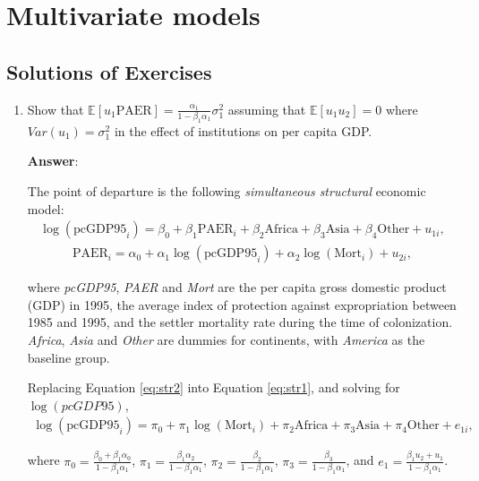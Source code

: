 \chapter{Multivariate models}\label{chap7}

\section{Solutions of Exercises}\label{sec71}
\begin{enumerate}[leftmargin=*]

	\item Show that $\mathbb{E}[u_1\text{PAER}]=\frac{\alpha_1}{1-\beta_1\alpha_1}\sigma^2_1$ assuming that $\mathbb{E}[u_1u_2]=0$ where $Var(u_1)=\sigma^2_1$ in the effect of institutions on per capita GDP.
	
	\textbf{Answer}:
	
	The point of departure is the following \textit{simultaneous structural} economic model:
	\begin{align}\label{eq:str1}
		\log(\text{pcGDP95}_i)=\beta_0+\beta_1\text{PAER}_i+\beta_2 \text{Africa}+\beta_3 \text{Asia}+\beta_4 \text{Other}+u_{1i},
	\end{align}
	\begin{align}\label{eq:str2}
		\text{PAER}_i=\alpha_0+\alpha_1\log(\text{pcGDP95}_i)+\alpha_2\log(\text{Mort}_i)+u_{2i},
	\end{align}

where \textit{pcGDP95}, \textit{PAER} and \textit{Mort} are the per capita gross domestic product (GDP) in 1995, the average index of protection against expropriation between 1985 and 1995, and the settler mortality rate during the time of colonization. \textit{Africa}, \textit{Asia} and \textit{Other} are dummies for continents, with \textit{America} as the baseline group.

Replacing Equation \ref{eq:str2} into Equation \ref{eq:str1}, and solving for $\log(\textit{pcGDP95})$,
\begin{align}\label{eq:red1}
	\log(\text{pcGDP95}_i)=\pi_0+\pi_1\log(\text{Mort}_i)+\pi_2 \text{Africa}+\pi_3 \text{Asia}+\pi_4 \text{Other}+e_{1i},   
\end{align}

where $\pi_0=\frac{\beta_0+\beta_1\alpha_0}{1-\beta_1\alpha_1}$, $\pi_1=\frac{\beta_1\alpha_2}{1-\beta_1\alpha_1}$, $\pi_2=\frac{\beta_2}{1-\beta_1\alpha_1}$, $\pi_3=\frac{\beta_3}{1-\beta_1\alpha_1}$, and $e_1=\frac{\beta_1u_2+u_1}{1-\beta_1\alpha_1}$.


\end{enumerate}
